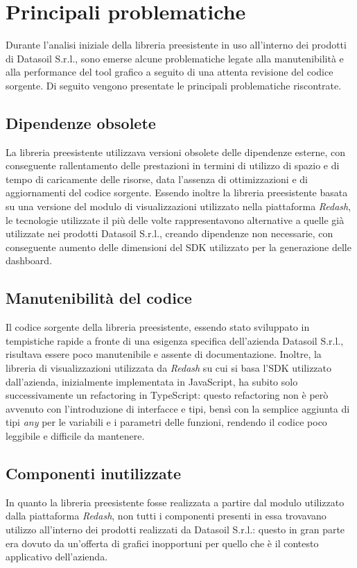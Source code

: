 \section{Principali problematiche}
Durante l'analisi iniziale della libreria preesistente in uso all'interno dei prodotti di Datasoil S.r.l., sono emerse alcune problematiche
legate alla manutenibilità e alla performance del tool grafico a seguito di una attenta revisione del codice sorgente. \newline
Di seguito vengono presentate le principali problematiche riscontrate.

\subsection{Dipendenze obsolete}
La libreria preesistente utilizzava versioni obsolete delle dipendenze esterne, con conseguente rallentamento delle prestazioni in termini
di utilizzo di spazio e di tempo di caricamente delle risorse, data l'assenza di ottimizzazioni e di aggiornamenti del codice sorgente. \newline
Essendo inoltre la libreria preesistente basata su una versione del modulo di visualizzazioni utilizzato nella piattaforma \textit{Redash},
le tecnologie utilizzate il più delle volte rappresentavono alternative a quelle già utilizzate nei prodotti Datasoil S.r.l., creando dipendenze
non necessarie, con conseguente aumento delle dimensioni del SDK utilizzato per la generazione delle dashboard.

\subsection{Manutenibilità del codice}
Il codice sorgente della libreria preesistente, essendo stato sviluppato in tempistiche rapide a fronte di una esigenza specifica dell'azienda Datasoil S.r.l.,
risultava essere poco manutenibile e assente di documentazione. \newline
Inoltre, la libreria di visualizzazioni utilizzata da \textit{Redash} su cui si basa l'SDK utilizzato dall'azienda, inizialmente implementata in JavaScript,
ha subito solo successivamente un refactoring in TypeScript: questo refactoring non è però avvenuto con l'introduzione di interfacce e tipi, bensì con la semplice aggiunta
di tipi \textit{any} per le variabili e i parametri delle funzioni, rendendo il codice poco leggibile e difficile da mantenere.

\subsection{Componenti inutilizzate}
In quanto la libreria preesistente fosse realizzata a partire dal modulo utilizzato dalla piattaforma \textit{Redash}, non tutti i componenti presenti
in essa trovavano utilizzo all'interno dei prodotti realizzati da Datasoil S.r.l.: questo in gran parte era dovuto da un'offerta di grafici inopportuni
per quello che è il contesto applicativo dell'azienda.

